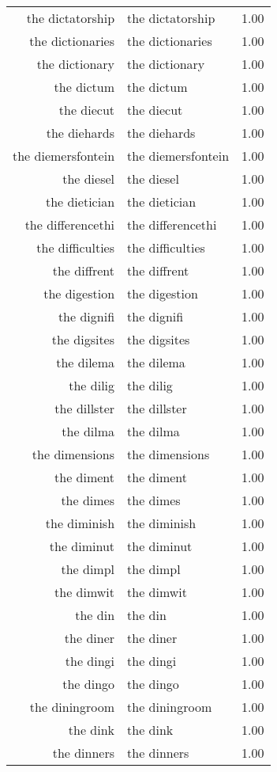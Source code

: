 \begin{table}[ht]
\begin{tabular}{rlr}
  the dictatorship & the dictatorship & 1.00 \\ 
  the dictionaries & the dictionaries & 1.00 \\ 
  the dictionary & the dictionary & 1.00 \\ 
  the dictum & the dictum & 1.00 \\ 
  the diecut & the diecut & 1.00 \\ 
  the diehards & the diehards & 1.00 \\ 
  the diemersfontein & the diemersfontein & 1.00 \\ 
  the diesel & the diesel & 1.00 \\ 
  the dietician & the dietician & 1.00 \\ 
  the differencethi & the differencethi & 1.00 \\ 
  the difficulties & the difficulties & 1.00 \\ 
  the diffrent & the diffrent & 1.00 \\ 
  the digestion & the digestion & 1.00 \\ 
  the dignifi & the dignifi & 1.00 \\ 
  the digsites & the digsites & 1.00 \\ 
  the dilema & the dilema & 1.00 \\ 
  the dilig & the dilig & 1.00 \\ 
  the dillster & the dillster & 1.00 \\ 
  the dilma & the dilma & 1.00 \\ 
  the dimensions & the dimensions & 1.00 \\ 
  the diment & the diment & 1.00 \\ 
  the dimes & the dimes & 1.00 \\ 
  the diminish & the diminish & 1.00 \\ 
  the diminut & the diminut & 1.00 \\ 
  the dimpl & the dimpl & 1.00 \\ 
  the dimwit & the dimwit & 1.00 \\ 
  the din & the din & 1.00 \\ 
  the diner & the diner & 1.00 \\ 
  the dingi & the dingi & 1.00 \\ 
  the dingo & the dingo & 1.00 \\ 
  the diningroom & the diningroom & 1.00 \\ 
  the dink & the dink & 1.00 \\ 
  the dinners & the dinners & 1.00 \\ 

\end{tabular}
\end{table}
